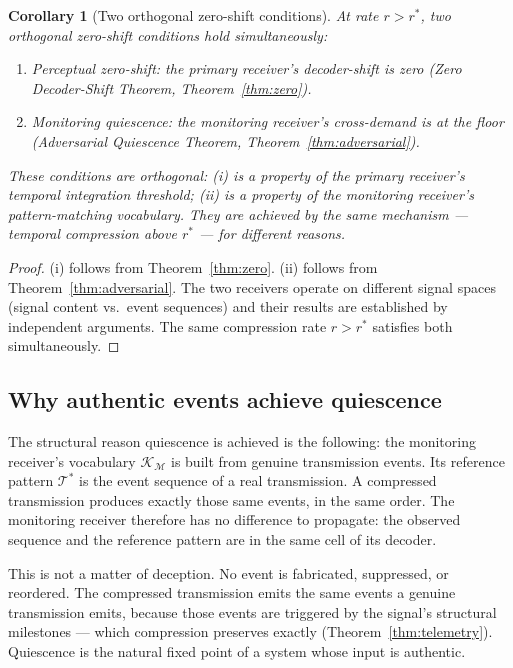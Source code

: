 \documentclass[twocolumn,11pt,a4paper]{article}
\theoremstyle{main}
\newtheorem{corollary}[theorem]{Corollary}
\theoremstyle{definition}
\theoremstyle{remark}
\newcommand{\Know}{\mathcal{K}}
\newcommand{\rate}{r}
\newcommand{\Mon}{\mathcal{M}}        %
\newcommand{\Tel}{\mathcal{T}}        %
\begin{document}
\begin{corollary}[Two orthogonal zero-shift conditions]
\label{cor:twoorthogonal}
At rate $\rate > \rate^*$, two orthogonal zero-shift conditions hold
simultaneously:
\begin{enumerate}[label=(\roman*), leftmargin=1.8em, itemsep=1pt]
\item \emph{Perceptual zero-shift}: the primary receiver's
  decoder-shift is zero (Zero Decoder-Shift Theorem,
  Theorem~\ref{thm:zero}).
\item \emph{Monitoring quiescence}: the monitoring receiver's
  cross-demand is at the floor (Adversarial Quiescence Theorem,
  Theorem~\ref{thm:adversarial}).
\end{enumerate}
These conditions are orthogonal: (i) is a property of the primary
receiver's temporal integration threshold; (ii) is a property of the
monitoring receiver's pattern-matching vocabulary. They are achieved
by the same mechanism --- temporal compression above $\rate^*$ --- for
different reasons.
\end{corollary}

\begin{proof}
(i) follows from Theorem~\ref{thm:zero}. (ii) follows from
Theorem~\ref{thm:adversarial}. The two receivers operate on different
signal spaces (signal content vs.\ event sequences) and their results
are established by independent arguments. The same compression rate
$\rate > \rate^*$ satisfies both simultaneously.
\end{proof}

\subsection{Why authentic events achieve quiescence}

The structural reason quiescence is achieved is the following: the
monitoring receiver's vocabulary $\Know_\Mon$ is built from genuine
transmission events. Its reference pattern $\Tel^*$ is the event
sequence of a real transmission. A compressed transmission produces
exactly those same events, in the same order. The monitoring receiver
therefore has no difference to propagate: the observed sequence and
the reference pattern are in the same cell of its decoder.

This is not a matter of deception. No event is fabricated, suppressed,
or reordered. The compressed transmission emits the same events a
genuine transmission emits, because those events are triggered by the
signal's structural milestones --- which compression preserves exactly
(Theorem~\ref{thm:telemetry}). Quiescence is the natural fixed point
of a system whose input is authentic.
\end{document}
